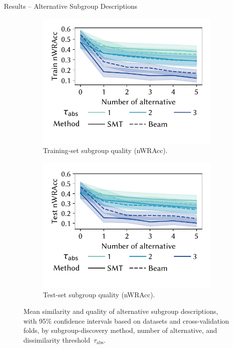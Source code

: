 \documentclass[en, navbaroff, handout]{sdqbeamer}
\begin{document}
\begin{frame}[t]{Results -- Alternative Subgroup Descriptions}
\begin{figure}[t]
\begin{subfigure}[t]{0.32\textwidth}
			\centering
			\includegraphics[width=\textwidth, trim=10 25 10 10, clip]{plots/csd-alternatives-train-nwracc.pdf}
			\caption{Training-set subgroup quality (nWRAcc).}
			\label{fig:csd:alternatives-train-nwracc}
		\end{subfigure}
		\hfill
		\begin{subfigure}[t]{0.32\textwidth}
			\centering
			\includegraphics[width=\textwidth, trim=10 25 10 10, clip]{plots/csd-alternatives-test-nwracc.pdf}
			\caption{Test-set subgroup quality (nWRAcc).}
			\label{fig:csd:alternatives-test-nwracc}
		\end{subfigure}
		\caption*{
			Mean similarity and quality of alternative subgroup descriptions, with 95\% confidence intervals based on datasets and cross-validation folds, by subgroup-discovery method, number of alternative, and dissimilarity threshold~$\tau_{\text{abs}}$.
		}
		\label{fig:csd:alternatives}
	\end{figure}
\end{frame}
\end{document}
